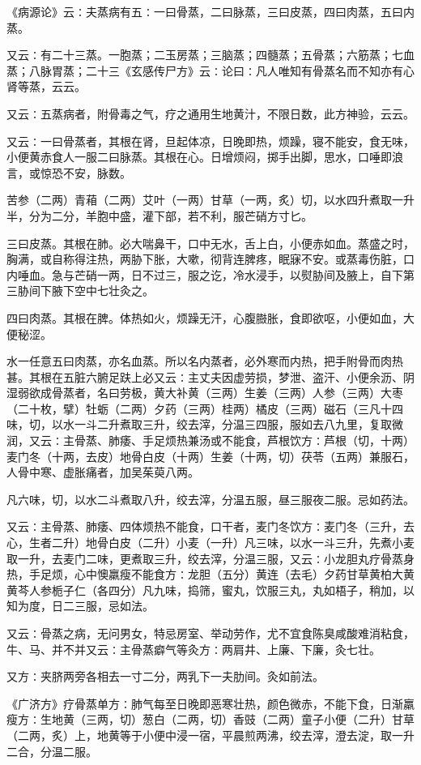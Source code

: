 \documentclass[a4paper,12pt,UTF8,twoside]{ctexbook}
\begin{document}
《病源论》云∶夫蒸病有五∶一曰骨蒸，二曰脉蒸，三曰皮蒸，四曰肉蒸，五曰内蒸。

又云∶有二十三蒸。一胞蒸；二玉房蒸；三脑蒸；四髓蒸；五骨蒸；六筋蒸；七血蒸；八脉胃蒸；二十三《玄感传尸方》云∶论曰∶凡人唯知有骨蒸名而不知亦有心肾等蒸，云云。

又云∶五蒸病者，附骨毒之气，疗之通用生地黄汁，不限日数，此方神验，云云。

又云∶一曰骨蒸者，其根在肾，旦起体凉，日晚即热，烦躁，寝不能安，食无味，小便黄赤食人一服二曰脉蒸。其根在心。日增烦闷，掷手出脚，思水，口唾即浪言，或惊恐不安，脉数。

苦参（二两）青葙（二两）艾叶（一两）甘草（一两，炙）切，以水四升煮取一升半，分为二分，羊胞中盛，灌下部，若不利，服芒硝方寸匕。

三曰皮蒸。其根在肺。必大喘鼻干，口中无水，舌上白，小便赤如血。蒸盛之时，胸满，或自称得注热，两胁下胀，大嗽，彻背连脾疼，眠寐不安。或蒸毒伤脏，口内唾血。急与芒硝一两，日不过三，服之讫，冷水浸手，以熨胁间及腋上，自下第三胁间下腋下空中七壮灸之。

四曰肉蒸。其根在脾。体热如火，烦躁无汗，心腹臌胀，食即欲呕，小便如血，大便秘涩。

水一任意五曰肉蒸，亦名血蒸。所以名内蒸者，必外寒而内热，把手附骨而肉热甚。其根在五脏六腑足趺上必又云∶主丈夫因虚劳损，梦泄、盗汗、小便余沥、阴湿弱欲成骨蒸者，名曰劳极，黄大补黄（三两）生姜（三两）人参（三两）大枣（二十枚，擘）牡蛎（二两）夕药（三两）桂两）橘皮（三两）磁石（三凡十四味，切，以水一斗二升煮取三升，绞去滓，分温三四服，服如去八九里，复取微润，又云∶主骨蒸、肺痿、手足烦热兼汤或不能食，芦根饮方∶芦根（切，十两）麦门冬（十两，去皮）地骨白皮（十两）生姜（十两，切）茯苓（五两）兼服石，人骨中寒、虚胀痛者，加吴茱萸八两。

凡六味，切，以水二斗煮取八升，绞去滓，分温五服，昼三服夜二服。忌如药法。

又云∶主骨蒸、肺痿、四体烦热不能食，口干者，麦门冬饮方∶麦门冬（三升，去心，生者二升）地骨白皮（二升）小麦（一升）凡三味，以水一斗三升，先煮小麦取一升，去麦门二味，更煮取三升，绞去滓，分温三服，又云∶小龙胆丸疗骨蒸身热，手足烦，心中懊羸瘦不能食方∶龙胆（五分）黄连（去毛）夕药甘草黄柏大黄黄芩人参栀子仁（各四分）凡九味，捣筛，蜜丸，饮服三丸，丸如梧子，稍加，以知为度，日二三服，忌如法。

又云∶骨蒸之病，无问男女，特忌房室、举动劳作，尤不宜食陈臭咸酸难消粘食，牛、马、并不并又云∶主骨蒸癖气等灸方∶两肩井、上廉、下廉，灸七壮。

又方∶夹脐两旁各相去一寸二分，两乳下一夫肋间。灸如前法。

《广济方》疗骨蒸单方∶肺气每至日晚即恶寒壮热，颜色微赤，不能下食，日渐羸瘦方∶生地黄（三两，切）葱白（二两，切）香豉（二两）童子小便（二升）甘草（二两，炙）上，地黄等于小便中浸一宿，平晨煎两沸，绞去滓，澄去淀，取一升二合，分温二服。
\end{document}

